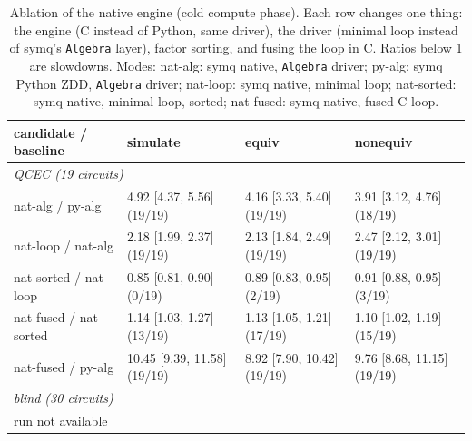 \begin{table}[t]
\centering\footnotesize
\caption{Ablation of the native engine (cold compute phase). Each row changes one thing: the engine (C instead of Python, same driver), the driver (minimal loop instead of symq's \texttt{Algebra} layer), factor sorting, and fusing the loop in C. Ratios below 1 are slowdowns. Modes: \textsf{nat-alg}: symq native, \texttt{Algebra} driver; \textsf{py-alg}: symq Python ZDD, \texttt{Algebra} driver; \textsf{nat-loop}: symq native, minimal loop; \textsf{nat-sorted}: symq native, minimal loop, sorted; \textsf{nat-fused}: symq native, fused C loop.}
\label{tab:ablation}
\begin{tabular}{llll}
\toprule
candidate / baseline & simulate & equiv & nonequiv \\
\midrule
\multicolumn{4}{l}{\emph{QCEC (19 circuits)}} \\
\textsf{nat-alg} / \textsf{py-alg} & 4.92 [4.37, 5.56]\,{\scriptsize(19/19)} & 4.16 [3.33, 5.40]\,{\scriptsize(19/19)} & 3.91 [3.12, 4.76]\,{\scriptsize(18/19)} \\
\textsf{nat-loop} / \textsf{nat-alg} & 2.18 [1.99, 2.37]\,{\scriptsize(19/19)} & 2.13 [1.84, 2.49]\,{\scriptsize(19/19)} & 2.47 [2.12, 3.01]\,{\scriptsize(19/19)} \\
\textsf{nat-sorted} / \textsf{nat-loop} & 0.85 [0.81, 0.90]\,{\scriptsize(0/19)} & 0.89 [0.83, 0.95]\,{\scriptsize(2/19)} & 0.91 [0.88, 0.95]\,{\scriptsize(3/19)} \\
\textsf{nat-fused} / \textsf{nat-sorted} & 1.14 [1.03, 1.27]\,{\scriptsize(13/19)} & 1.13 [1.05, 1.21]\,{\scriptsize(17/19)} & 1.10 [1.02, 1.19]\,{\scriptsize(15/19)} \\
\textsf{nat-fused} / \textsf{py-alg} & 10.45 [9.39, 11.58]\,{\scriptsize(19/19)} & 8.92 [7.90, 10.42]\,{\scriptsize(19/19)} & 9.76 [8.68, 11.15]\,{\scriptsize(19/19)} \\
\midrule
\multicolumn{4}{l}{\emph{blind (30 circuits)}} \\
\multicolumn{4}{l}{run not available} \\
\bottomrule
\end{tabular}
\end{table}
